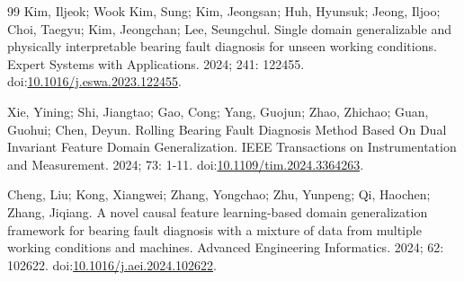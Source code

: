 \documentclass[machines,article,submit,oneauthor]{Definitions/mdpi}
\begin{document}
\begin{thebibliography}{99}
 Kim, Iljeok; Wook Kim, Sung; Kim, Jeongsan; Huh, Hyunsuk; Jeong, Iljoo; Choi, Taegyu; Kim, Jeongchan; Lee, Seungchul. Single domain generalizable and physically interpretable bearing fault diagnosis for unseen working conditions. Expert Systems with Applications. 2024; 241: 122455. doi:\url{10.1016/j.eswa.2023.122455}.

 Xie, Yining; Shi, Jiangtao; Gao, Cong; Yang, Guojun; Zhao, Zhichao; Guan, Guohui; Chen, Deyun. Rolling Bearing Fault Diagnosis Method Based On Dual Invariant Feature Domain Generalization. IEEE Transactions on Instrumentation and Measurement. 2024; 73: 1-11. doi:\url{10.1109/tim.2024.3364263}.

 Cheng, Liu; Kong, Xiangwei; Zhang, Yongchao; Zhu, Yunpeng; Qi, Haochen; Zhang, Jiqiang. A novel causal feature learning-based domain generalization framework for bearing fault diagnosis with a mixture of data from multiple working conditions and machines. Advanced Engineering Informatics. 2024; 62: 102622. doi:\url{10.1016/j.aei.2024.102622}.
\end{thebibliography}
\end{document}
